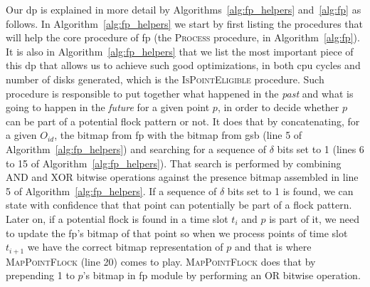 Our \ac{dp} is explained in more detail by Algorithms~\ref{alg:fp_helpers} and~\ref{alg:fp} as follows. In
Algorithm~\ref{alg:fp_helpers} we start by first listing the procedures that will help the core procedure of \ac{fp}
(the \textsc{Process} procedure, in Algorithm~\ref{alg:fp}). It is also in Algorithm~\ref{alg:fp_helpers} that we list
the most important piece of this \ac{dp} that allows us to achieve such good optimizations, in both \ac{cpu} cycles and
number of disks generated, which is the \textsc{IsPointEligible} procedure. Such procedure is responsible to put
together what happened in the \textit{past} and what is going to happen in the \textit{future} for a given point $p$, in
order to decide whether $p$ can be part of a potential flock pattern or not. It does that by concatenating, for a given
$O_{id}$, the bitmap from \ac{fp} with the bitmap from \ac{gsb} (line 5 of Algorithm~\ref{alg:fp_helpers}) and searching
for a sequence of $\delta$ bits set to 1 (lines 6 to 15 of Algorithm~\ref{alg:fp_helpers}). That search is performed by
combining AND and XOR bitwise operations against the presence bitmap assembled in line 5 of
Algorithm~\ref{alg:fp_helpers}. If a sequence of $\delta$ bits set to 1 is found, we can state with confidence that that
point can potentially be part of a flock pattern. Later on, if a potential flock is found in a time slot $t_i$ and $p$
is part of it, we need to update the \ac{fp}'s bitmap of that point so when we process points of time slot $t_{i+1}$ we
have the correct bitmap representation of $p$ and that is where \textsc{MapPointFlock} (line 20) comes to play.
\textsc{MapPointFlock} does that by prepending 1 to $p$'s bitmap in \ac{fp} module by performing an OR bitwise
operation.

